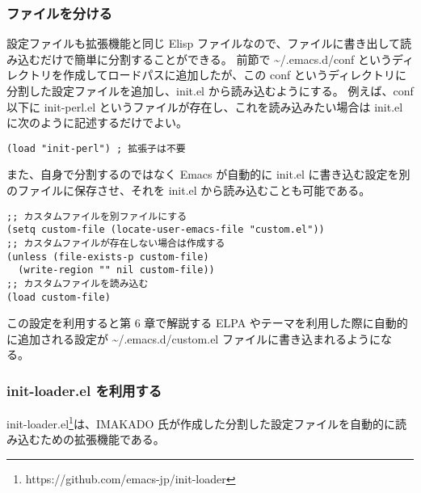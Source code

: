 \subsubsection{ファイルを分ける}
設定ファイルも拡張機能と同じ Elisp ファイルなので、ファイルに書き出して読み込むだけで簡単に分割することができる。
前節で \textasciitilde/.emacs.d/conf というディレクトリを作成してロードパスに追加したが、この conf というディレクトリに分割した設定ファイルを追加し、init.el から読み込むようにする。
例えば、conf 以下に init-perl.el というファイルが存在し、これを読み込みたい場合は init.el に次のように記述するだけでよい。
\begin{mdframed}[roundcorner=0.50zw,leftmargin=3.00zw,rightmargin=3.00zw,skipabove=0.40zw,skipbelow=0.40zw,innertopmargin=4.00pt,innerbottommargin=4.00pt,innerleftmargin=5.00pt,innerrightmargin=5.00pt,linecolor=gray!020,linewidth=0.50pt,backgroundcolor=gray!20]
\begin{verbatim}
(load "init-perl") ; 拡張子は不要
\end{verbatim}
\end{mdframed}
また、自身で分割するのではなく Emacs が自動的に init.el に書き込む設定を別のファイルに保存させ、それを init.el から読み込むことも可能である。
\begin{mdframed}[roundcorner=0.50zw,leftmargin=3.00zw,rightmargin=3.00zw,skipabove=0.40zw,skipbelow=0.40zw,innertopmargin=4.00pt,innerbottommargin=4.00pt,innerleftmargin=5.00pt,innerrightmargin=5.00pt,linecolor=gray!020,linewidth=0.50pt,backgroundcolor=gray!20]
\begin{verbatim}
;; カスタムファイルを別ファイルにする
(setq custom-file (locate-user-emacs-file "custom.el"))
;; カスタムファイルが存在しない場合は作成する
(unless (file-exists-p custom-file)
  (write-region "" nil custom-file))
;; カスタムファイルを読み込む
(load custom-file)
\end{verbatim}
\end{mdframed}
この設定を利用すると第 6 章で解説する ELPA やテーマを利用した際に自動的に追加される設定が \textasciitilde{}/.emacs.d/custom.el ファイルに書き込まれるようになる。
\subsubsection{init-loader.el を利用する}
init-loader.el\footnote{https://github.com/emacs-jp/init-loader}は、IMAKADO 氏が作成した分割した設定ファイルを自動的に読み込むための拡張機能である。\\

